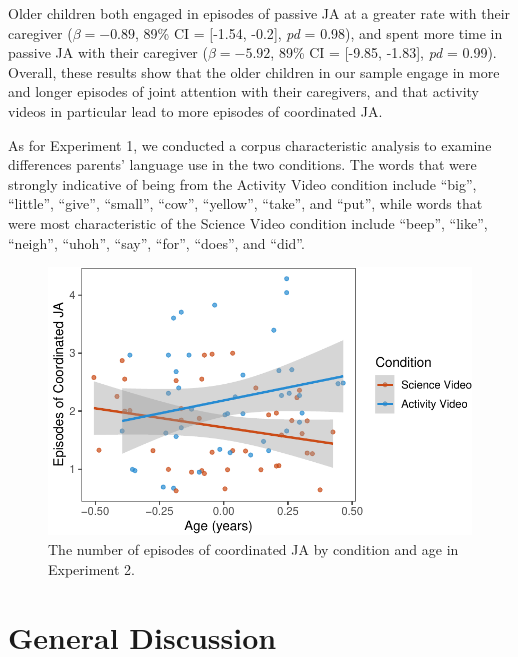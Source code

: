 \documentclass[man,floatsintext]{apa6}
\begin{document}
Older children both engaged in episodes of passive JA at a greater rate with their caregiver (\(\beta=-0.89\), 89\% CI = {[}-1.54, -0.2{]}, \emph{pd} = 0.98), and spent more time in passive JA with their caregiver (\(\beta=-5.92\), 89\% CI = {[}-9.85, -1.83{]}, \emph{pd} = 0.99).
Overall, these results show that the older children in our sample engage in more and longer episodes of joint attention with their caregivers, and that activity videos in particular lead to more episodes of coordinated JA.

As for Experiment 1, we conducted a corpus characteristic analysis to examine differences parents' language use in the two conditions.
The words that were strongly indicative of being from the Activity Video condition include \enquote{big}, \enquote{little}, \enquote{give}, \enquote{small}, \enquote{cow}, \enquote{yellow}, \enquote{take}, and \enquote{put}, while words that were most characteristic of the Science Video condition include \enquote{beep}, \enquote{like}, \enquote{neigh}, \enquote{uhoh}, \enquote{say}, \enquote{for}, \enquote{does}, and \enquote{did}.

\begin{figure}[H]

{\centering \includegraphics{figs/e2ja-coord-1} 

}

\caption{The number of episodes of coordinated JA by condition and age in Experiment 2.}\label{fig:e2ja-coord}
\end{figure}

\hypertarget{general-discussion}{%
\section{General Discussion}\label{general-discussion}}
\end{document}
